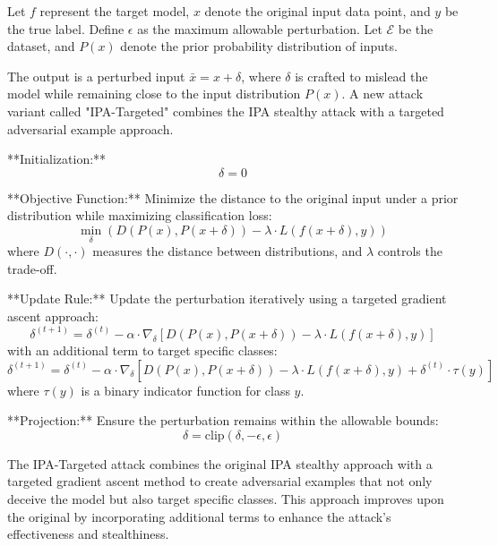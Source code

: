 Let \( f \) represent the target model, \( x \) denote the original input data point, and \( y \) be the true label. Define \( \epsilon \) as the maximum allowable perturbation. Let \( \mathcal{E} \) be the dataset, and \( P(x) \) denote the prior probability distribution of inputs.

The output is a perturbed input \( \bar{x} = x + \delta \), where \( \delta \) is crafted to mislead the model while remaining close to the input distribution \( P(x) \). A new attack variant called "IPA-Targeted" combines the IPA stealthy attack with a targeted adversarial example approach.

**Initialization:**  
\[
\delta = 0
\]

**Objective Function:**  
Minimize the distance to the original input under a prior distribution while maximizing classification loss:
\[
\min_{\delta} \left( D(P(x), P(x + \delta)) - \lambda \cdot L(f(x + \delta), y) \right)
\]
where \( D(\cdot, \cdot) \) measures the distance between distributions, and \( \lambda \) controls the trade-off.

**Update Rule:**  
Update the perturbation iteratively using a targeted gradient ascent approach:
\[
\delta^{(t+1)} = \delta^{(t)} - \alpha \cdot \nabla_{\delta} \left[ D(P(x), P(x + \delta)) - \lambda \cdot L(f(x + \delta), y) \right]
\]
with an additional term to target specific classes:
\[
\delta^{(t+1)} = \delta^{(t)} - \alpha \cdot \nabla_{\delta} \left[ D(P(x), P(x + \delta)) - \lambda \cdot L(f(x + \delta), y) + \delta^{(t)} \cdot \tau(y) \right]
\]
where \( \tau(y) \) is a binary indicator function for class \( y \).

**Projection:**  
Ensure the perturbation remains within the allowable bounds:
\[
\delta = \text{clip}(\delta, -\epsilon, \epsilon)
\]

The IPA-Targeted attack combines the original IPA stealthy approach with a targeted gradient ascent method to create adversarial examples that not only deceive the model but also target specific classes. This approach improves upon the original by incorporating additional terms to enhance the attack's effectiveness and stealthiness.
